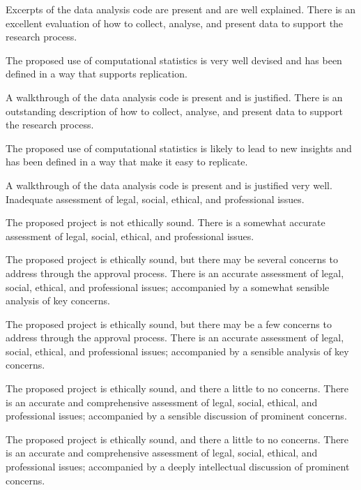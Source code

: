 \begin{markingrubric}
        \par		Excerpts of the data analysis code are present and are well explained.   
        \grade 		There is an excellent evaluation of how to collect, analyse, and present data to support the research process.
         \par		The proposed use of computational statistics is very well devised and has been defined in a way that supports replication.      
        \par		A walkthrough of the data analysis code is present and is justified.   
        \grade 		There is an outstanding description of how to collect, analyse, and present data to support the research process.
         \par		The proposed use of computational statistics is likely to lead to new insights and has been defined in a way that make it easy to replicate.        
        \par		A walkthrough of the data analysis code is present and is justified very well. 
%
        \grade\fail 	Inadequate assessment of legal, social, ethical, and professional issues.
         \par		The proposed project is not ethically sound.
        \grade 		There is a somewhat accurate assessment of legal, social, ethical, and professional issues.
        \par		The proposed project is ethically sound, but there may be several concerns to address through the approval process.
        \grade 		There is an accurate assessment of legal, social, ethical, and professional issues; accompanied by a somewhat sensible analysis of key concerns.
        \par		The proposed project is ethically sound, but there may be a few concerns to address through the approval process.
        \grade 		There is an accurate assessment of legal, social, ethical, and professional issues; accompanied by a sensible analysis of key concerns.
        \par		The proposed project is ethically sound, and there a little to no concerns.
        \grade 		There is an accurate and comprehensive assessment of legal, social, ethical, and professional issues; accompanied by a sensible discussion of prominent concerns.
        \par		The proposed project is ethically sound, and there a little to no concerns.
        \grade 		There is an accurate and comprehensive assessment of legal, social, ethical, and professional issues; accompanied by a deeply intellectual discussion of prominent concerns.

\end{markingrubric}
